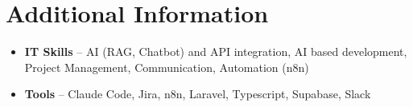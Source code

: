 \documentclass[a4paper,10pt]{article}
\begin{document}
\section{Additional Information}
\begin{itemize}
\item \textbf{IT Skills} -- AI (RAG, Chatbot) and API integration, AI based development, Project Management, Communication, Automation (n8n)
\item \textbf{Tools} -- Claude Code, Jira, n8n, Laravel, Typescript, Supabase, Slack
\end{itemize}
\end{document}
